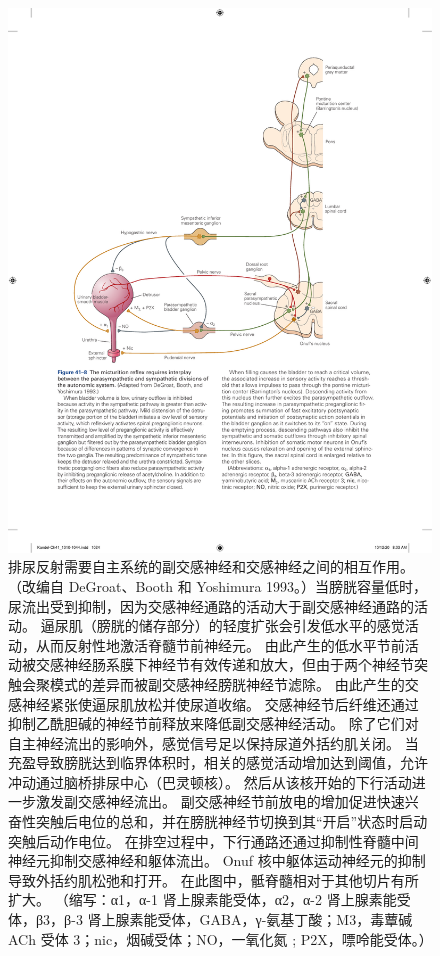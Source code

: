 \begin{figure}[htbp]
	\centering
	\includegraphics[width=0.9\linewidth]{chap41/fig_41_8}
	\caption{排尿反射需要自主系统的副交感神经和交感神经之间的相互作用。 （改编自 DeGroat、Booth 和 Yoshimura 1993。）当膀胱容量低时，尿流出受到抑制，因为交感神经通路的活动大于副交感神经通路的活动。 逼尿肌（膀胱的储存部分）的轻度扩张会引发低水平的感觉活动，从而反射性地激活脊髓节前神经元。 由此产生的低水平节前活动被交感神经肠系膜下神经节有效传递和放大，但由于两个神经节突触会聚模式的差异而被副交感神经膀胱神经节滤除。 由此产生的交感神经紧张使逼尿肌放松并使尿道收缩。 交感神经节后纤维还通过抑制乙酰胆碱的神经节前释放来降低副交感神经活动。 除了它们对自主神经流出的影响外，感觉信号足以保持尿道外括约肌关闭。 当充盈导致膀胱达到临界体积时，相关的感觉活动增加达到阈值，允许冲动通过脑桥排尿中心（巴灵顿核）。 然后从该核开始的下行活动进一步激发副交感神经流出。 副交感神经节前放电的增加促进快速兴奋性突触后电位的总和，并在膀胱神经节切换到其“开启”状态时启动突触后动作电位。 在排空过程中，下行通路还通过抑制性脊髓中间神经元抑制交感神经和躯体流出。 Onuf 核中躯体运动神经元的抑制导致外括约肌松弛和打开。 在此图中，骶脊髓相对于其他切片有所扩大。 （缩写：α1，α-1 肾上腺素能受体，α2，α-2 肾上腺素能受体，β3，β-3 肾上腺素能受体，GABA，γ-氨基丁酸；M3，毒蕈碱 ACh 受体 3；nic，烟碱受体；NO，一氧化氮 ; P2X，嘌呤能受体。）}
	\label{fig:41_8}
\end{figure}


